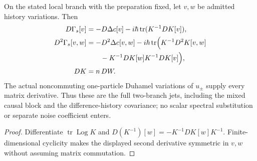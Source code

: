 \documentclass[12pt,a4paper]{article}
\begin{document}
\begin{corollary}
\label{p3f:cor:v247-car-logdet-jets}
On the stated local branch with the preparation fixed, let $v,w$ be
admitted history variations. Then
\begin{align*}
 D\Gamma_s[v]&=-D\Delta c[v]
          -i\hbar\operatorname{tr}(K^{-1}DK[v]),\\
 D^2\Gamma_s[v,w]&=-D^2\Delta c[v,w]
 -i\hbar\operatorname{tr}\Bigl(
 K^{-1}D^2K[v,w]\\
 &\qquad{}-K^{-1}DK[w]K^{-1}DK[v]\Bigr),\\
 DK&=n\,DW.
\end{align*}
The actual noncommuting one-particle Duhamel variations of $u_\pm$
supply every matrix derivative. Thus these are the full two-branch jets,
including the mixed causal block and the difference-history covariance;
no scalar spectral substitution or separate noise coefficient enters.
\end{corollary}
\begin{proof}
Differentiate $\operatorname{tr}\operatorname{Log} K$ and
$D(K^{-1})[w]=-K^{-1}DK[w]K^{-1}$.
Finite-dimensional cyclicity makes the displayed second derivative
symmetric in $v,w$ without assuming matrix commutation.
\end{proof}
\end{document}
